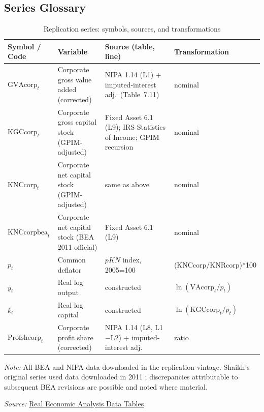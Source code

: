 

\subsection{Series Glossary}

\begin{table}[!ht]
	\centering
	\small
	\setlength{\tabcolsep}{3pt}
	\renewcommand{\arraystretch}{1.15}
	\caption{Replication series: symbols, sources, and transformations}
	\label{tab:app_glossary}
	\begin{tabular}{@{}>{\raggedright\arraybackslash}p{}
			>{\raggedright\arraybackslash}p{}
			>{\raggedright\arraybackslash}p{}
			>{\raggedright\arraybackslash}p{}@{}}
		\hline
		Symbol / Code & Variable & Source (table, line) & Transformation \\
		\hline
		$\text{GVAcorp}_t$ 
		& Corporate gross value added (corrected)
		& NIPA 1.14 (L1) + imputed-interest adj.\ (Table~7.11)
		& nominal \\[3pt]
		$\text{KGCcorp}_t$ 
		& Corporate gross capital stock (GPIM-adjusted)
		& Fixed Asset 6.1 (L9); IRS Statistics of Income; GPIM recursion
		& nominal \\[3pt]
		$\text{KNCcorp}_t$ 
		& Corporate net capital stock (GPIM-adjusted)
		& same as above
		& nominal \\[3pt]
		$\text{KNCcorpbea}_t$
		& Corporate net capital stock (BEA 2011 official)
		& Fixed Asset 6.1 (L9)
		& nominal \\[3pt]
		$p_t$ 
		& Common deflator
		& $pKN$ index, 2005=100 
		& (KNCcorp/KNRcorp)*100 \\[3pt]
		$y_t$
		& Real log output
		& constructed
		& $\ln(\text{VAcorp}_t/p_t)$ \\[3pt]
		$k_t$
		& Real log capital
		& constructed
		& $\ln(\text{KGCcorp}_t/p_t)$ \\[3pt]
		$\text{Profshcorp}_t$ 
		& Corporate profit share (corrected)
		& NIPA 1.14 (L8, L1$-$L2) + imputed-interest adj.
		& ratio \\
		\hline
	\end{tabular}
	\par\vspace{0.4em}
	\footnotesize\textit{Note:} All BEA and NIPA data downloaded in the
	replication vintage. Shaikh's original series used data downloaded in
	2011 \citep[Appendix~6.7, fn.~1]{Shaikh2016}; discrepancies attributable
	to subsequent BEA revisions are possible and noted where material.
	\par\vspace{0.2em}
	\footnotesize\textit{Source:}
	\href{https://www.realecon.org/data}{Real Economic Analysis Data Tables}
\end{table}

